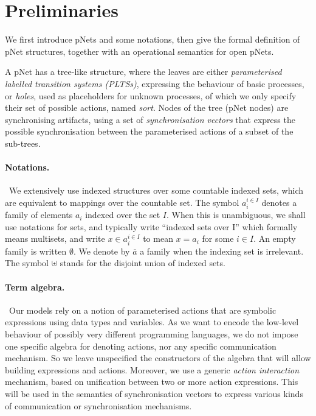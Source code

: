 \documentclass[smallcondensed]{svjour3}
\begin{document}
\section{Preliminaries}
\label{section:pnets}

We first introduce pNets and some notations, then give the formal definition of pNet structures, together with an operational semantics for open pNets.

A pNet has a tree-like structure, where the leaves are either
\emph{parameterised labelled transition systems (PLTSs)}, expressing the
behaviour of basic processes, or \emph{holes}, used as placeholders
for unknown processes, of which we only specify their set of possible
actions, named \emph{sort}.
Nodes of the tree (pNet nodes) are synchronising artifacts, using a
set of \emph{synchronisation vectors} that express the possible
synchronisation between the parameterised actions of a subset of the
sub-trees.


\paragraph*{Notations.} \
We extensively use indexed structures
over some countable indexed sets, which are equivalent to mappings over
the countable set. %
The symbol $a_i^{i\in I}$
denotes a family of elements $a_i$ indexed over the
set $I$.
When this is unambiguous, we shall use notations for sets, and typically write
``indexed sets over I'' which formally means multisets, and
write $x\in a_i^{i\in I}$ to mean $x=a_i$ for some $i\in I$.  An empty
family is written $\emptyset$. We
denote by $\overline{a}$ a family when the indexing set is
irrelevant. The symbol $\uplus$ stands for the disjoint union of indexed sets.

\paragraph*{Term algebra.} \
Our models rely on a notion of parameterised actions that are
symbolic expressions using data types and variables. As we want to encode
the low-level behaviour of possibly very different
programming languages, we do not impose one specific algebra
for denoting actions, nor any specific communication mechanism. So we
leave unspecified the constructors of the algebra that will allow building
expressions and actions. Moreover, we use a generic {\em action interaction}
mechanism, based on unification between two or more action
expressions. This will be used in the semantics of synchronisation
vectors to express various kinds of communication or synchronisation mechanisms.
\end{document}
